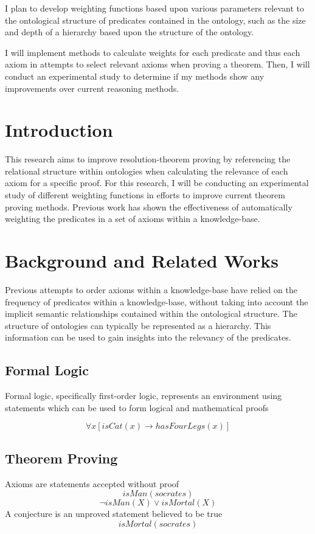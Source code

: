 \documentclass{article}
\begin{document}
I plan to develop weighting functions based upon various parameters relevant to the ontological structure of predicates contained in the ontology, such as the size and depth of a hierarchy based upon the structure of the ontology. 

I will implement methods to calculate weights for each predicate and thus each axiom in attempts to select relevant axioms when proving a theorem. Then, I will conduct an experimental study to determine if my methods show any improvements over current reasoning methods. 

\newpage

\section{Introduction}
This research aims to improve resolution-theorem proving by referencing the relational structure within ontologies when calculating the relevance of each axiom for a specific proof. For this research, I will be conducting an experimental study of different weighting functions in efforts to improve current theorem proving methods. Previous work has shown the effectiveness of automatically weighting the predicates in a set of axioms within a knowledge-base.

\section{Background and Related Works}

Previous attempts to order axioms within a knowledge-base have relied on the frequency of predicates within a knowledge-base, without taking into account the implicit semantic relationships contained within the ontological structure. The structure of ontologies can typically be represented as a hierarchy. This information can be used to gain insights into the relevancy of the predicates. 

\subsection{Formal Logic}
	Formal logic, specifically first-order logic, represents an environment using statements which can be used to form logical and mathematical proofs
	    
	    \[\forall x [isCat(x) \rightarrow hasFourLegs(x)]\]
	
	
	    \subsection{Theorem Proving}
	    Axioms are statements accepted without proof
        \[isMan(socrates)\]
        \[\lnot isMan(X)\lor isMortal(X)\]
	    A conjecture is an unproved statement believed to be true 
	    \[isMortal(socrates)\]
	
\end{document}
